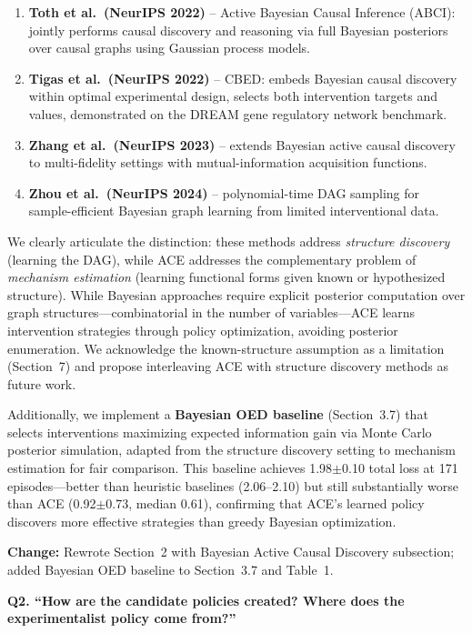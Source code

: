 \documentclass[11pt]{article}
\newcommand{\reviewer}[1]{\vspace{0.8em}\noindent\textbf{\textcolor{reviewercolor}{#1}}}
\newcommand{\change}[1]{\textcolor{changecolor}{\textbf{Change:} #1}}
\begin{document}
\begin{enumerate}[nosep]
\item \textbf{Toth et al.\ (NeurIPS 2022)} -- Active Bayesian Causal Inference (ABCI): jointly performs causal discovery and reasoning via full Bayesian posteriors over causal graphs using Gaussian process models.
\item \textbf{Tigas et al.\ (NeurIPS 2022)} -- CBED: embeds Bayesian causal discovery within optimal experimental design, selects both intervention targets and values, demonstrated on the DREAM gene regulatory network benchmark.
\item \textbf{Zhang et al.\ (NeurIPS 2023)} -- extends Bayesian active causal discovery to multi-fidelity settings with mutual-information acquisition functions.
\item \textbf{Zhou et al.\ (NeurIPS 2024)} -- polynomial-time DAG sampling for sample-efficient Bayesian graph learning from limited interventional data.
\end{enumerate}

We clearly articulate the distinction: these methods address \emph{structure discovery} (learning the DAG), while ACE addresses the complementary problem of \emph{mechanism estimation} (learning functional forms given known or hypothesized structure). While Bayesian approaches require explicit posterior computation over graph structures---combinatorial in the number of variables---ACE learns intervention strategies through policy optimization, avoiding posterior enumeration. We acknowledge the known-structure assumption as a limitation (Section~7) and propose interleaving ACE with structure discovery methods as future work.

Additionally, we implement a \textbf{Bayesian OED baseline} (Section~3.7) that selects interventions maximizing expected information gain via Monte Carlo posterior simulation, adapted from the structure discovery setting to mechanism estimation for fair comparison. This baseline achieves 1.98$\pm$0.10 total loss at 171 episodes---better than heuristic baselines (2.06--2.10) but still substantially worse than ACE (0.92$\pm$0.73, median 0.61), confirming that ACE's learned policy discovers more effective strategies than greedy Bayesian optimization.

\change{Rewrote Section~2 with Bayesian Active Causal Discovery subsection; added Bayesian OED baseline to Section~3.7 and Table~1.}

\reviewer{Q2. ``How are the candidate policies created? Where does the experimentalist policy come from?''}
\end{document}
